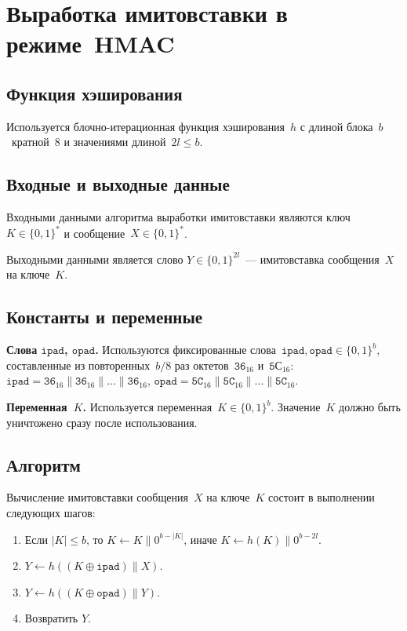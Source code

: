 \section{Выработка имитовставки в режиме~HMAC}\label{HMAC}

\subsection{Функция хэширования}

Используется блочно-итерационная функция хэширования~$h$ 
с длиной блока~$b$~кратной~$8$ 
и значениями длиной~$2l\leq b$.

\subsection{Входные и выходные данные}

Входными данными алгоритма выработки имитовставки
являются ключ~$K\in\{0,1\}^*$ и сообщение~$X\in\{0,1\}^*$.

Выходными данными является слово $Y\in\{0,1\}^{2l}$~---
имитовставка сообщения~$X$ на ключе~$K$.

\subsection{Константы и переменные}

{\bf Слова $\texttt{ipad}$, $\texttt{opad}$.}
Используются фиксированные 
слова~$\texttt{ipad},\texttt{opad}\in\{0,1\}^{b}$,
составленные из повторенных~$b/8$ раз 
октетов~$\texttt{36}_{16}$ и~$\texttt{5С}_{16}$: 
$\texttt{ipad}=\texttt{36}_{16}\parallel\texttt{36}_{16}\parallel\ldots
\parallel\texttt{36}_{16}$,
$\texttt{opad}=\texttt{5C}_{16}\parallel\texttt{5C}_{16}\parallel\ldots
\parallel\texttt{5C}_{16}$.

{\bf Переменная~$K$.}
Используется переменная~$K\in\{0,1\}^{b}$.
%
Значение~$K$ должно быть уничтожено сразу после использования.

\subsection{Алгоритм}

Вычисление имитовставки сообщения~$X$ на ключе~$K$ 
состоит в выполнении следующих шагов:
\begin{enumerate}
\item
Если $|K|\leq b$, то 
$K\leftarrow K\parallel 0^{b-|K|}$,
иначе 
$K\leftarrow h(K)\parallel 0^{b-2l}$.
\item
$Y\leftarrow h((K\oplus\texttt{ipad})\parallel X)$.
\item
$Y\leftarrow h((K\oplus\texttt{opad})\parallel Y)$.
\item
Возвратить $Y$.
\end{enumerate}
